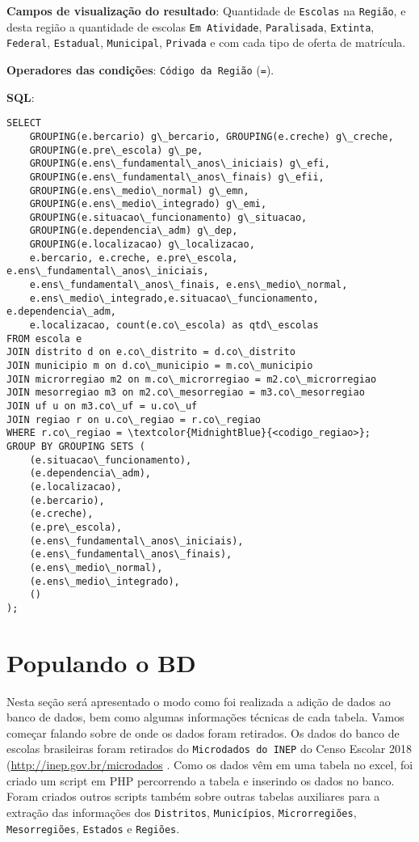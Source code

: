 \documentclass[12pt,a4paper]{article}
\begin{document}
\begin{enumerate}
        \textbf{Campos de visualização do resultado}: Quantidade de \texttt{Escolas} na \texttt{Região}, e desta região a quantidade de escolas \texttt{Em Atividade}, \texttt{Paralisada}, \texttt{Extinta}, \texttt{Federal}, \texttt{Estadual}, \texttt{Municipal}, \texttt{Privada} e com cada tipo de oferta de matrícula.
        
        \textbf{Operadores das condições}: \texttt{Código da Região} (\texttt{=}).
        
        \textbf{SQL}:
        \begin{Verbatim}[commandchars=\\\{\}]
SELECT
    GROUPING(e.bercario) g\_bercario, GROUPING(e.creche) g\_creche, 
    GROUPING(e.pre\_escola) g\_pe,
    GROUPING(e.ens\_fundamental\_anos\_iniciais) g\_efi,
    GROUPING(e.ens\_fundamental\_anos\_finais) g\_efii, 
    GROUPING(e.ens\_medio\_normal) g\_emn,
    GROUPING(e.ens\_medio\_integrado) g\_emi, 
    GROUPING(e.situacao\_funcionamento) g\_situacao,
    GROUPING(e.dependencia\_adm) g\_dep, 
    GROUPING(e.localizacao) g\_localizacao,
    e.bercario, e.creche, e.pre\_escola, e.ens\_fundamental\_anos\_iniciais,
    e.ens\_fundamental\_anos\_finais, e.ens\_medio\_normal,
    e.ens\_medio\_integrado,e.situacao\_funcionamento, e.dependencia\_adm, 
    e.localizacao, count(e.co\_escola) as qtd\_escolas
FROM escola e
JOIN distrito d on e.co\_distrito = d.co\_distrito
JOIN municipio m on d.co\_municipio = m.co\_municipio
JOIN microrregiao m2 on m.co\_microrregiao = m2.co\_microrregiao
JOIN mesorregiao m3 on m2.co\_mesorregiao = m3.co\_mesorregiao
JOIN uf u on m3.co\_uf = u.co\_uf
JOIN regiao r on u.co\_regiao = r.co\_regiao
WHERE r.co\_regiao = \textcolor{MidnightBlue}{<codigo_regiao>};
GROUP BY GROUPING SETS (
    (e.situacao\_funcionamento),
    (e.dependencia\_adm),
    (e.localizacao),
    (e.bercario),
    (e.creche),
    (e.pre\_escola),
    (e.ens\_fundamental\_anos\_iniciais),
    (e.ens\_fundamental\_anos\_finais),
    (e.ens\_medio\_normal),
    (e.ens\_medio\_integrado),
    ()
);
        \end{Verbatim}
        
\end{enumerate}


\section{Populando o BD}

Nesta seção será apresentado o modo como foi realizada a adição de dados ao banco de dados, bem como algumas informações técnicas de cada tabela. Vamos começar falando sobre de onde os dados foram retirados. Os dados do banco de escolas brasileiras foram retirados do \texttt{Microdados do INEP} do Censo Escolar 2018 (\url{http://inep.gov.br/microdados} . Como os dados vêm em uma tabela no excel, foi criado um script em PHP percorrendo a tabela e inserindo os dados no banco. Foram criados outros scripts também sobre outras tabelas auxiliares para a extração das informações dos \texttt{Distritos}, \texttt{Municípios}, \texttt{Microrregiões}, \texttt{Mesorregiões}, \texttt{Estados} e \texttt{Regiões}.
\end{document}
